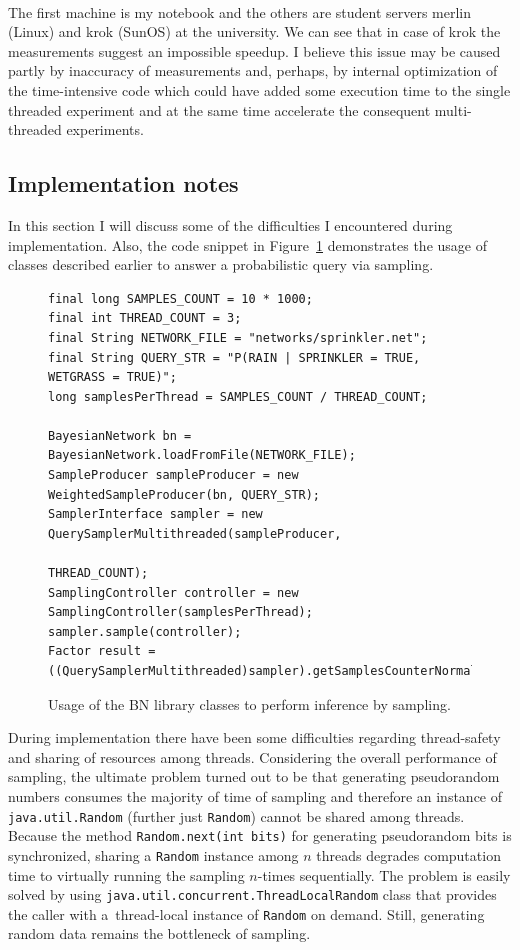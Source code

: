 \documentclass[english,cover]{fitthesis} %
\newcommand{\srccode}[1]{{\tt #1}}         %
\newcommand{\ignore}[1]{}                  %
\begin{document}
\begin{table}[htb]
{    \ignore{Median was used because sometimes the computation was really slow (typically the very first sampling)}\\
    The first machine is my notebook and the others are student servers merlin (Linux) and krok (SunOS) at the university. We can see that in case of krok the measurements suggest an impossible speedup. I believe this issue may be caused partly by inaccuracy of measurements and, perhaps, by internal optimization of the time-intensive code which could have added some execution time to the single threaded experiment and at the same time accelerate the consequent multi-threaded experiments.
    }
    \label{tbl:sampling_multithread_speedup}
\end{table}

\subsection{Implementation notes}
In this section I will discuss some of the difficulties I encountered during implementation. Also, the code snippet in Figure~\ref{fig:snippet-sampling} demonstrates the usage of classes described earlier to answer a probabilistic query via sampling.

\begin{figure}[ht]
\centering
{\small
\begin{verbatim}
final long SAMPLES_COUNT = 10 * 1000;
final int THREAD_COUNT = 3;
final String NETWORK_FILE = "networks/sprinkler.net";
final String QUERY_STR = "P(RAIN | SPRINKLER = TRUE, WETGRASS = TRUE)";
long samplesPerThread = SAMPLES_COUNT / THREAD_COUNT;

BayesianNetwork bn = BayesianNetwork.loadFromFile(NETWORK_FILE);
SampleProducer sampleProducer = new WeightedSampleProducer(bn, QUERY_STR);
SamplerInterface sampler = new QuerySamplerMultithreaded(sampleProducer,
                                                         THREAD_COUNT);
SamplingController controller = new SamplingController(samplesPerThread);
sampler.sample(controller);
Factor result = ((QuerySamplerMultithreaded)sampler).getSamplesCounterNormalized();
\end{verbatim}
}
\caption{Usage of the BN library classes to perform inference by sampling.}
\label{fig:snippet-sampling}
\end{figure}

During implementation there have been some difficulties regarding thread-safety and sharing of resources among threads. Considering the overall performance of sampling, the ultimate problem turned out to be that generating pseudorandom numbers consumes the majority of time of sampling and therefore an instance of \srccode{java.util.Random} (further just \srccode{Random}) cannot be shared among threads. Because the method \srccode{Random.next(int bits)} for generating pseudorandom bits is synchronized, sharing a \srccode{Random} instance among $n$ threads degrades computation time to virtually running the sampling $n$-times sequentially. The problem is easily solved by using \srccode{java.util.concurrent.ThreadLocalRandom} class that provides the caller with a~thread-local instance of \srccode{Random} on demand. Still, generating random data remains the bottleneck of sampling.
\end{document}
